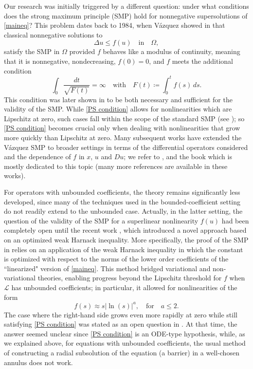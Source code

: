 \documentclass[12pt,a4paper]{amsart}
\numberwithin{equation}{section} %
\theoremstyle{definition}
\theoremstyle{remark}
\begin{document}
 
Our research was initially triggered by a different question: under what conditions does the strong maximum principle (SMP) hold for nonnegative supersolutions of \eqref{maineq}? This problem dates back to 1984, when V\'azquez showed in \cite{V84} that classical nonnegative solutions to
\begin{equation}\label{vasquez MP}
    \Delta u \leq f(u) \quad \text{in} \quad \Omega,
\end{equation}
satisfy the SMP in $\Omega$ provided $f$ behaves like a modulus of continuity, meaning that it is nonnegative, nondecreasing,  $f(0) = 0$, and $f$  meets the additional condition
\begin{equation}\label{PS condition}
     \int_{0}\frac{dt}{\sqrt{F(t)}} = \infty \quad \text{with} \quad F(t) \coloneqq \int_{0}^{t}f(s) \, ds.
\end{equation}
This condition was later shown in \cite{PS00} to be both necessary and sufficient for the validity of the SMP. 
While \eqref{PS condition} allows for nonlinearities which are Lipschitz at zero, such cases fall within the scope of the standard SMP (see \cites{EV, H52,GT}); so \eqref{PS condition} becomes crucial only when dealing with nonlinearities that grow more quickly than Lipschitz at zero. Many subsequent works have extended the V\'azquez SMP to broader settings in terms of the differential operators considered and the dependence of $f$ in $x$, $u$ and $Du$; we refer to \cite{FMQ09, PR18, PS00, PSZ},  and the book \cite{PS} which is mostly dedicated to this topic (many more references are available in these works).  

For operators with unbounded coefficients, the theory remains significantly less developed, since many of the techniques used in the bounded-coefficient setting do not readily extend to the unbounded case. Actually, in the latter setting, the question of the validity of the SMP for a superlinear nonlinearity $f(u)$ had been completely open until the recent work \cite{SS21}, which introduced a novel approach based on an optimized weak Harnack inequality. More specifically, the proof of the SMP in \cite{SS21} relies on an application of the weak Harnack inequality in which the constant is optimized with respect to the norms of the lower order coefficients of the ``linearized" version of \eqref{maineq}. This method bridged variational and non-variational theories, enabling progress beyond the Lipschitz threshold for $f$ when $\mathcal{L}$ has unbounded coefficients; in particular, it allowed for nonlinearities of the form
$$
    f(s) \approx s|\ln(s)|^a, \quad \text{for} \quad a \leq 2.
$$
The case where the right-hand side grows even more rapidly at zero while still satisfying \eqref{PS condition} was stated as an open question in \cite{SS21}. At that time, the answer seemed unclear since \eqref{PS condition} is an ODE-type hypothesis, while, as we explained above, for equations with unbounded coefficients, the usual method of constructing a radial subsolution of the equation (a barrier) in a well-chosen annulus does not work. 
\end{document}
